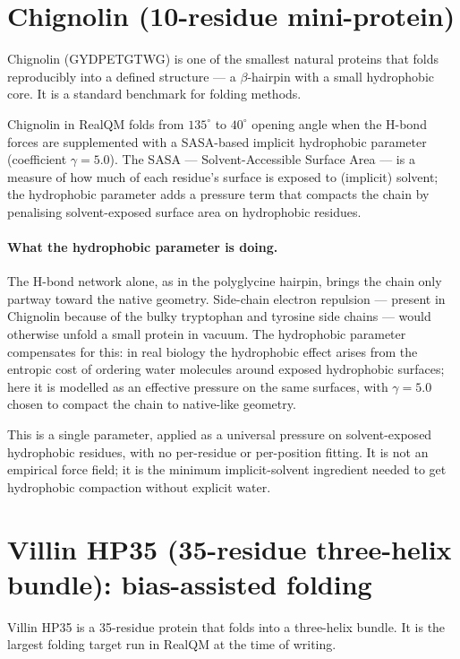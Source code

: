 \section{Chignolin (10-residue mini-protein)}\label{sec:chignolin}

Chignolin (GYDPETGTWG) is one of the smallest natural proteins that folds reproducibly into a defined structure --- a $\beta$-hairpin with a small hydrophobic core. It is a standard benchmark for folding methods.

Chignolin in RealQM folds from $135^\circ$ to $40^\circ$ opening angle when the H-bond forces are supplemented with a SASA-based implicit hydrophobic parameter (coefficient $\gamma = 5.0$). The SASA --- Solvent-Accessible Surface Area --- is a measure of how much of each residue's surface is exposed to (implicit) solvent; the hydrophobic parameter adds a pressure term that compacts the chain by penalising solvent-exposed surface area on hydrophobic residues.

\paragraph{What the hydrophobic parameter is doing.}
The H-bond network alone, as in the polyglycine hairpin, brings the chain only partway toward the native geometry. Side-chain electron repulsion --- present in Chignolin because of the bulky tryptophan and tyrosine side chains --- would otherwise unfold a small protein in vacuum. The hydrophobic parameter compensates for this: in real biology the hydrophobic effect arises from the entropic cost of ordering water molecules around exposed hydrophobic surfaces; here it is modelled as an effective pressure on the same surfaces, with $\gamma = 5.0$ chosen to compact the chain to native-like geometry.

This is a single parameter, applied as a universal pressure on solvent-exposed hydrophobic residues, with no per-residue or per-position fitting. It is not an empirical force field; it is the minimum implicit-solvent ingredient needed to get hydrophobic compaction without explicit water.

\section{Villin HP35 (35-residue three-helix bundle): bias-assisted folding}\label{sec:villin}

Villin HP35 is a 35-residue protein that folds into a three-helix bundle. It is the largest folding target run in RealQM at the time of writing.

